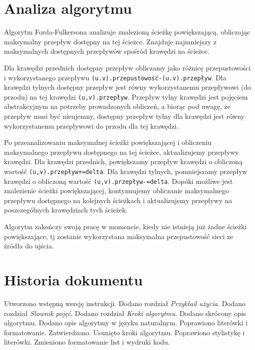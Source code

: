 \documentclass[10pt]{dokument-tiwo}
\begin{document}
\section{Analiza algorytmu}
\label{sec:analiza}

Algorytm Forda-Fulkersona analizuje znalezioną ścieżkę powiększającą, obliczając
maksymalny przepływ dostępny na tej ścieżce. Znajduje najmniejszy z maksymalnych
dostępnych przepływów spośród krawędzi na ścieżce.

Dla krawędzi przednich dostępny przepływ obliczamy jako różnicę przepustowości i
wykorzystanego przepływu \texttt{(u.v).przepustowość-(u.v).przepływ}. Dla
krawędzi tylnych dostępny przepływ jest równy wykorzystanemu przepływowi (do
przodu) na tej krawędzi \texttt{(u,v).przepływ}. Przepływ tylny krawędzi jest
pojęciem abstrakcyjnym na potrzeby prowadzonych obliczeń, a biorąc pod uwagę, że
przepływ musi być nieujemny, dostępny przepływ tylny dla krawędzi jest równy
wykorzystanemu przepływowi do przodu dla tej krawędzi.

Po przeanalizowaniu maksymalnej ścieżki powiększającej i obliczeniu maksymalnego
przepływu dostępnego na tej ścieżce, aktualizujemy przepływy krawędzi. Dla
krawędzi przednich, powiększamy przepływ krawędzi o obliczoną wartość
\texttt{(u,v).przepływ+=delta}. Dla krawędzi tylnych, pomniejszamy przepływ
krawędzi o obliczoną wartość \texttt{(u,v).przepływ-=delta}. Dopóki możliwe jest
znalezienie ścieżki powiększającej, kontynuujemy obliczanie maksymalnego
przepływu dostępnego na kolejnych ścieżkach i aktualizujemy przepływy na
poszczególnych krawędziach tych ścieżek.

Algorytm zakończy swoją pracę w momencie, kiedy nie istnieją już żadne ścieżki
powiększające, tj zostanie wykorzystana maksymalna przepustowość sieci ze źródła
do ujścia.


\section{Historia dokumentu}
\begin{versions}
        Utworzono wstępną wersję instrukcji.
        Dodano rozdział \emph{Przykład użycia}.
        Dodano rozdział \emph{Słownik pojęć}.
        Dodano rozdział \emph{Kroki algorytmu}.
        Dodano skrócony opis algorytmu. Dodano opis algorytmy w języku
        naturalnym.
        Poprawiono literówki i formatowanie.
        Zatwierdzono.
        Usunięto kroki algorytmu.
        Poprawiono stylistykę i literówki.
        Zmieniono formatowanie list i wydruki kodu.
\end{versions}
\end{document}
